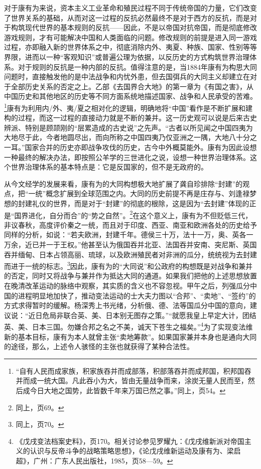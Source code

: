 \documentclass[a4paper, 12pt, openright]{ctexbook}
\begin{document}
对于康有为来说，资本主义工业革命和殖民过程不同于传统帝国的力量，它们改变了世界关系的基础，从而对这一过程的反抗必然最终不是对于西方的反抗，而是对于构筑现代世界的基本规则的反抗——因此，不是以帝国对抗帝国，而是彻底修改游戏规则，才有可能解决中国和人类面临的问题。修改规则的前提是进入同一游戏过程，亦即融入新的世界体系之中，彻底消除内外、夷夏、种族、国家、性别等等界限，进而以一种“客观知识”或普遍公理为依据，以反历史的方式构筑世界治理体系。对于规则的反抗是一种内部的反抗。值得注意的是，当1884年康有为构思大同问题时，直接触发他的是中法战争和内忧外患，但去国弭兵的大同主义却建立在对于全部历史关系的否定之上。乙部《去国界合大地》的第一章为《有国之害》，从中国历史和其他地区的历史等不同方面系统地描述国家、战争和人民承受的苦难。\footnote{“自有人民而成家族，积家族吞并而成部落，积部落吞并而成邦国，积邦国吞并而成一统大国。凡此吞小为大，皆由无量战争而来，涂炭无量人民而至，然后成今日大地之国势，此皆数千年来万国已然之事。”同上，页54。}康有为利用内/外、夷/夏之相对化的逻辑，明确地将“中国”看作是不断扩展和建构的过程，而这一过程的直接动力就是不断的兼并。这一历史观可以说是后来古史辨派、特别是顾颉刚的“层累造成的古史说”之先声。“古者以所见闻之中国四夷为大地尽于此，今者地圆尽出，而向所称之中国四夷乃仅亚洲之一隅，大地八十分之一耳。”国家合并的历史亦即战争攻伐的历史，古今中外概莫能外。康有为因此设想一种最终的解决办法，即按照公羊学的三世进化之说，设想一种世界治理体系。这个世界治理体系的基本特点是：它是反国家的，但不是无政府的。

从今文经学的发展来看，康有为的大同构想极大地扩展了龚自珍排除“封建”的观点，把“一统”概念扩展到全球范围之内。大同的历史前提不再是庄存与、刘逢禄梦想的封建礼仪的世界，而是对于“封建”的彻底的根除，这是因为“去封建”体现的正是“国界进化，自分而合”的“势之自然”。\footnote{同上，页69。}在这个意义上，康有为不但贬低三代，非议春秋，高度评价秦之一统，而且对于印度、西亚、南亚和欧洲各处的历史给予同样的分析，如说：“若夫欧洲，封建千年。德侯三十万，法十一万，奥、英各一万余，近已并一于王权。”他甚至认为俄国吞并北亚、法国吞并安南、突尼斯、英国吞并缅甸、日本占领高丽、琉球，以及欧洲殖民者对非洲的瓜分，统统视为去封建而进于一统的标志。\footnote{同上，页70。}因此，康有为的“大同说”和公政府的构想既是对战争和兼并的否定，同时又将战争与兼并作为抵达大同的通道。如果我们把他的上述思想放置在晚清改革运动的脉络中观察，其实质的含义也不容忽视。甲午之后，列强瓜分中国的进程明显地加快了，推动变法运动的士大夫力图以“合邦”、“卖地”、“签约”的方式求得暂时的缓解。杨深秀上书光绪，分析俄、德、法等国瓜分中国的意向，建议说：“近日危局非联合英、美、日本别无图存之策。”“就愿我皇上早定大计，团结英、美、日本三国。勿嫌合邦之名之不美，诚天下苍生之福矣。”\footnote{《戊戌变法档案史料》，页170。相关讨论参见罗耀九：《戊戌维新派对帝国主义的认识与反帝斗争的战略策略思想》，《论戊戌维新运动及康有为、梁启超》，广州：广东人民出版社，1985，页58—59。}为了实现变法维新的基本目标，康有为本人就曾主张“卖地筹款”。如果国家兼并本身也是通向大同的途径，那么，上述令人骇怪的主张也就获得了某种合法性。
\end{document}
